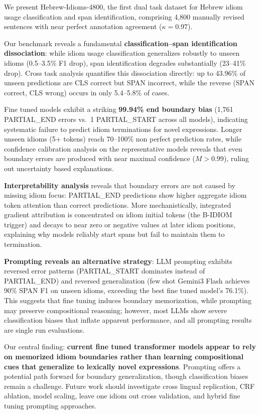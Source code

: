 \documentclass[11pt, a4paper]{report}
\begin{document}
We present Hebrew-Idioms-4800, the first dual task dataset for Hebrew idiom usage classification and span identification, comprising 4,800 manually revised sentences with near perfect annotation agreement ($\kappa = 0.97$).

Our benchmark reveals a fundamental \textbf{classification--span identification dissociation}: while idiom usage classification generalizes robustly to unseen idioms (0.5--3.5\% F1 drop), span identification degrades substantially (23--41\% drop). Cross task analysis quantifies this dissociation directly: up to 43.96\% of unseen predictions are CLS correct but SPAN incorrect, while the reverse (SPAN correct, CLS wrong) occurs in only 5.4--5.8\% of cases.

Fine tuned models exhibit a striking \textbf{99.94\% end boundary bias} (1,761 PARTIAL\_END errors vs.\ 1 PARTIAL\_START across all models), indicating systematic failure to predict idiom terminations for novel expressions. Longer unseen idioms (5+ tokens) reach 70--100\% non perfect prediction rates, while confidence calibration analysis on the representative models reveals that even boundary errors are produced with near maximal confidence ($M > 0.99$), ruling out uncertainty based explanations.

\textbf{Interpretability analysis} reveals that boundary errors are not caused by missing idiom focus: PARTIAL\_END predictions show higher aggregate idiom token attention than correct predictions. More mechanistically, integrated gradient attribution is concentrated on idiom initial tokens (the B-IDIOM trigger) and decays to near zero or negative values at later idiom positions, explaining why models reliably start spans but fail to maintain them to termination.

\textbf{Prompting reveals an alternative strategy}: LLM prompting exhibits reversed error patterns (PARTIAL\_START dominates instead of PARTIAL\_END) and reversed generalization (few shot Gemini3 Flash achieves 90\% SPAN F1 on unseen idioms, exceeding the best fine tuned model's 76.1\%). This suggests that fine tuning induces boundary memorization, while prompting may preserve compositional reasoning; however, most LLMs show severe classification biases that inflate apparent performance, and all prompting results are single run evaluations.

Our central finding: \textbf{current fine tuned transformer models appear to rely on memorized idiom boundaries rather than learning compositional cues that generalize to lexically novel expressions}. Prompting offers a potential path forward for boundary generalization, though classification biases remain a challenge. Future work should investigate cross lingual replication, CRF ablation, model scaling, leave one idiom out cross validation, and hybrid fine tuning prompting approaches.
\end{document}
